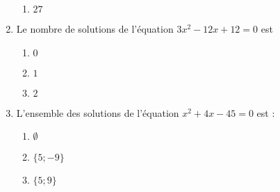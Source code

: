 \documentclass[oneside,twocolumn,landscape]{book}
\begin{document}
\begin{enumerate}
\begin{enumerate}
\item\MauvaiseReponse $27$


\end{enumerate}




\item Le nombre de solutions de l'équation $3x^{2}-12 x+12=0$ est

\begin{enumerate}


\item\MauvaiseReponse $0$


\item\BonneReponse $1$


\item\MauvaiseReponse $2$


\end{enumerate}





\item L'ensemble des solutions de l'équation $x^{2}+4 x-45=0$ est :

\begin{enumerate}


\item\MauvaiseReponse $\emptyset$


\item\BonneReponse $\{5 ;-9\}$


\item\MauvaiseReponse $\{5 ; 9\}$


\end{enumerate}




\end{enumerate}
\end{document}
